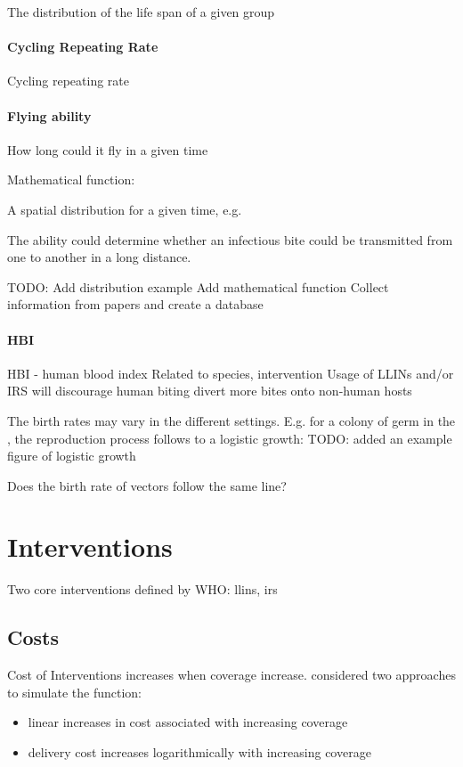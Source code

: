 \documentclass[a4paper, 12pt, twoside]{article}
\begin{document}
The distribution of the life span of a given group

\paragraph{Cycling Repeating Rate}
Cycling repeating rate

\paragraph{Flying ability}
How long could it fly in a given time

Mathematical function:

A spatial distribution for a given time, e.g.

The ability could determine whether an infectious bite could be transmitted from one to another in a long distance.

TODO:
Add distribution example
Add mathematical function
Collect information from papers and create a database
\paragraph{HBI}
HBI - human blood index
	Related to species, intervention
	Usage of LLINs and/or IRS will discourage human biting divert more bites onto non-human hosts

	The birth rates may vary in the different settings. E.g. for a colony of germ in the , the reproduction process follows to a logistic growth:
TODO: added an example figure of logistic growth
	
	Does the birth rate of vectors follow the same line?

\section{Interventions}

Two core interventions defined by WHO: \gls{llins}, \gls{irs}

\subsection{Costs}
Cost of Interventions increases when coverage increase. \cite{Winskill2017a} considered two approaches to simulate the function:
\begin{itemize}
	\item linear increases in cost associated with increasing coverage
	\item delivery cost increases logarithmically with increasing coverage
\end{itemize}
\end{document}
